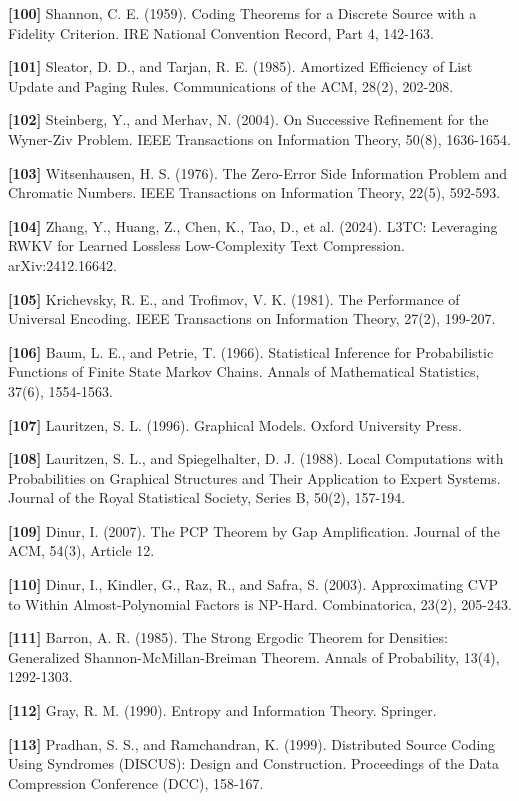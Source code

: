 \documentclass[
]{article}
\begin{document}
\textbf{{[}100{]}} Shannon, C. E. (1959). Coding Theorems for a Discrete
Source with a Fidelity Criterion. IRE National Convention Record, Part 4,
142-163.

\textbf{{[}101{]}} Sleator, D. D., and Tarjan, R. E. (1985). Amortized
Efficiency of List Update and Paging Rules. Communications of the ACM,
28(2), 202-208.

\textbf{{[}102{]}} Steinberg, Y., and Merhav, N. (2004). On Successive
Refinement for the Wyner-Ziv Problem. IEEE Transactions on Information
Theory, 50(8), 1636-1654.

\textbf{{[}103{]}} Witsenhausen, H. S. (1976). The Zero-Error Side
Information Problem and Chromatic Numbers. IEEE Transactions on
Information Theory, 22(5), 592-593.

\textbf{{[}104{]}} Zhang, Y., Huang, Z., Chen, K., Tao, D., et al.
(2024). L3TC: Leveraging RWKV for Learned Lossless Low-Complexity Text
Compression. arXiv:2412.16642.

\textbf{{[}105{]}} Krichevsky, R. E., and Trofimov, V. K. (1981). The
Performance of Universal Encoding. IEEE Transactions on Information
Theory, 27(2), 199-207.

\textbf{{[}106{]}} Baum, L. E., and Petrie, T. (1966). Statistical
Inference for Probabilistic Functions of Finite State Markov Chains.
Annals of Mathematical Statistics, 37(6), 1554-1563.

\textbf{{[}107{]}} Lauritzen, S. L. (1996). Graphical Models. Oxford
University Press.

\textbf{{[}108{]}} Lauritzen, S. L., and Spiegelhalter, D. J. (1988).
Local Computations with Probabilities on Graphical Structures and
Their Application to Expert Systems. Journal of the Royal Statistical
Society, Series B, 50(2), 157-194.

\textbf{{[}109{]}} Dinur, I. (2007). The PCP Theorem by Gap
Amplification. Journal of the ACM, 54(3), Article 12.

\textbf{{[}110{]}} Dinur, I., Kindler, G., Raz, R., and Safra, S.
(2003). Approximating CVP to Within Almost-Polynomial Factors is
NP-Hard. Combinatorica, 23(2), 205-243.

\textbf{{[}111{]}} Barron, A. R. (1985). The Strong Ergodic Theorem
for Densities: Generalized Shannon-McMillan-Breiman Theorem. Annals
of Probability, 13(4), 1292-1303.

\textbf{{[}112{]}} Gray, R. M. (1990). Entropy and Information
Theory. Springer.

\textbf{{[}113{]}} Pradhan, S. S., and Ramchandran, K. (1999).
Distributed Source Coding Using Syndromes (DISCUS): Design and
Construction. Proceedings of the Data Compression Conference (DCC),
158-167.
\end{document}
